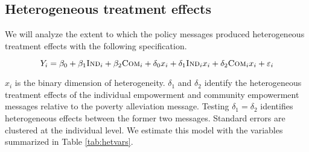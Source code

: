 \documentclass[11pt, a4paper]{article}\usepackage[]{graphicx}\usepackage[]{color}
\begin{document}
    \subsection{Heterogeneous treatment effects}

        We will analyze the extent to which the policy messages produced heterogeneous treatment effects with the following specification.

        \begin{equation}
            Y_{i} = \beta_{0} + \beta_{1}\text{\textsc{Ind}}_{i} + \beta_{2}\text{\textsc{Com}}_{i} + \delta_{0} x_i + \delta_{1}\text{\textsc{Ind}}_{i} x_i + \delta_{2}\text{\textsc{Com}}_{i} x_i + \varepsilon_{i}
        \label{eq:heteffect} \end{equation}

        $x_{i}$ is the binary dimension of heterogeneity. $\delta_{1}$ and $\delta_{2}$ identify the heterogeneous treatment effects of the individual empowerment and community empowerment messages relative to the poverty alleviation message. Testing $\delta_{1} = \delta_{2}$ identifies heterogeneous effects between the former two messages. Standard errors are clustered at the individual level. We estimate this model with the  variables summarized in Table \ref{tab:hetvars}.

        \begin{table}[h]
        \centering
        \caption{Dimensions of heterogeneity}
        \label{tab:hetvars}
        \end{table}

\newpage

\printbibliography

\newpage

\appendix
\end{document}
